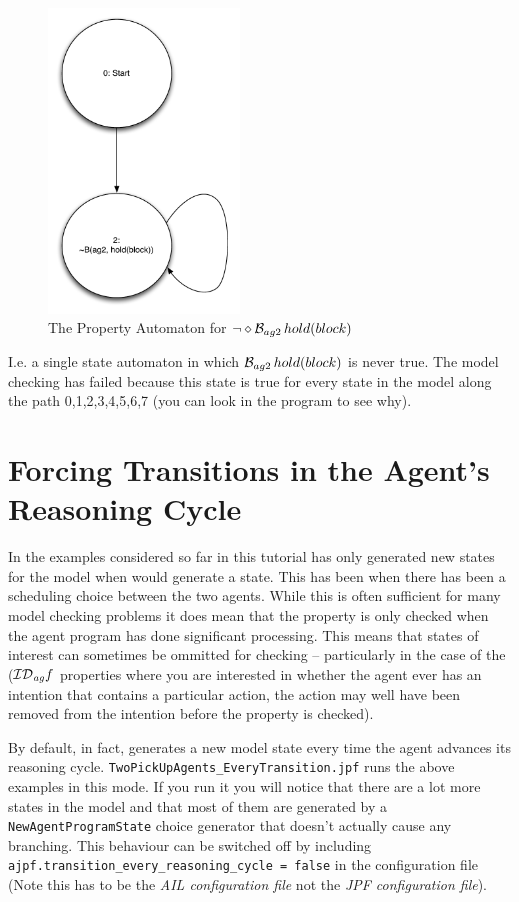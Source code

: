 \documentclass[a4]{article}
\begin{document}
\begin{figure}[htb]
\begin{center}
\includegraphics[width=2in]{property_automata.pdf}
\end{center}
\caption{The Property Automaton for $\neg \diamond \mathrm{{\cal B}}_{ag2} \, hold(block)$}
\label{fig:automaton}
\end{figure}

I.e. a single state automaton in which $\mathrm{{\cal B}}_{ag2} \, hold(block)$ is never true.  The model checking has failed because this state is true for every state in the model along the path 0,1,2,3,4,5,6,7 (you can look in the program to see why).

\section{Forcing Transitions in the Agent's Reasoning Cycle}
In the examples considered so far in this tutorial \ajpf{} has only generated new states for the model when \jpf{} would generate a state.  This has been when there has been a scheduling choice between the two agents.  While this is often sufficient for many model checking problems it does mean that the property is only checked when the agent program has done significant processing.  This means that states of interest can sometimes be ommitted for checking -- particularly in the case of the ($\mathrm{{\cal ID}}_{\mathit{ag}} f$ properties where you are interested in whether the agent ever has an intention that contains a particular action, the action may well have been removed from the intention before the property is checked).

\begin{sloppypar}
By default, in fact, \ajpf{} generates a new model state every time the agent advances its reasoning cycle.  \texttt{TwoPickUpAgents\_EveryTransition.jpf} runs the above examples in this mode.  If you run it you will notice that there are a lot more states in the model and that most of them are generated by a \texttt{NewAgentProgramState} choice generator that doesn't actually cause any branching.  This behaviour can be switched off by including \texttt{ajpf.transition\_every\_reasoning\_cycle = false} in the \ail{} configuration file (Note this has to be the \emph{AIL configuration file} not the \emph{JPF configuration file}).
\end{sloppypar}



\end{document}
